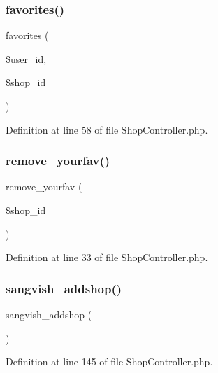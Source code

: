 \subsubsection{\texorpdfstring{favorites()}{favorites()}}
{\footnotesize\ttfamily favorites (\begin{DoxyParamCaption}\item[{}]{\$user\+\_\+id,  }\item[{}]{\$shop\+\_\+id }\end{DoxyParamCaption})}



Definition at line 58 of file Shop\+Controller.\+php.

\mbox{\label{class_responsive_1_1_http_1_1_controllers_1_1_shop_controller_a45b2fa0db65f3c00da989802f17399fc}} 
\subsubsection{\texorpdfstring{remove\_yourfav()}{remove\_yourfav()}}
{\footnotesize\ttfamily remove\+\_\+yourfav (\begin{DoxyParamCaption}\item[{}]{\$shop\+\_\+id }\end{DoxyParamCaption})}



Definition at line 33 of file Shop\+Controller.\+php.

\mbox{\label{class_responsive_1_1_http_1_1_controllers_1_1_shop_controller_a94ca394576518bac9378129d4e6698ce}} 
\subsubsection{\texorpdfstring{sangvish\_addshop()}{sangvish\_addshop()}}
{\footnotesize\ttfamily sangvish\+\_\+addshop (\begin{DoxyParamCaption}{ }\end{DoxyParamCaption})}



Definition at line 145 of file Shop\+Controller.\+php.

